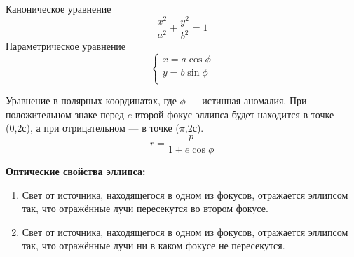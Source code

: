 Каноническое уравнение
\begin{equation}
\frac{x^2}{a^2}+\frac{y^2}{b^2}=1
\end{equation}
Параметрическое уравнение
\begin{equation}
\left\{
\begin{aligned}
x=a\cos \phi\\
y=b\sin\phi\\
\end{aligned}
\right.
\end{equation}

Уравнение в полярных координатах, где $\phi$ --- истинная аномалия. При положительном знаке перед $e$ второй фокус эллипса будет находится в точке (0,2с), а при отрицательном --- в точке ($\pi$,2с).
\begin{equation}
r=\frac{p}{1\pm e\cos\phi}
\end{equation}

\textbf{Оптические свойства эллипса:}
\begin{enumerate}
\item Свет от источника, находящегося в одном из фокусов, отражается эллипсом так, что отражённые лучи пересекутся во втором фокусе.
\item Свет от источника, находящегося в одном из фокусов, отражается эллипсом так, что отражённые лучи ни в каком фокусе не пересекутся.
\end{enumerate}





 
